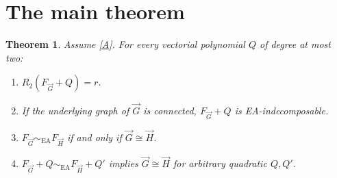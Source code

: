 \documentclass[11pt]{article}
\newtheorem{theorem}{Theorem}
\begin{document}
\section{The main theorem}
\begin{theorem}\label{main}
Assume \eqref{A}. For every vectorial polynomial $Q$ of degree at most two:
\begin{enumerate}
\item $R_2(F_{\vec G}+Q)=r$.
\item If the underlying graph of $\vec G$ is connected, $F_{\vec G}+Q$ is EA-indecomposable.
\item $F_{\vec G}\sim_{\mathrm{EA}}F_{\vec H}$ if and only if $\vec G\cong\vec H$.
\item $F_{\vec G}+Q\sim_{\mathrm{EA}}F_{\vec H}+Q'$ implies $\vec G\cong\vec H$ for arbitrary quadratic $Q,Q'$.
\end{enumerate}
\end{theorem}
\end{document}
